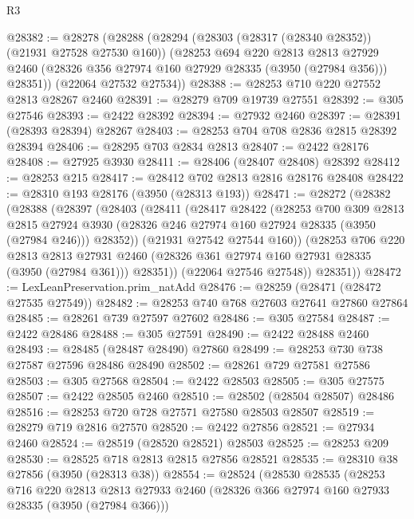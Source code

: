 \begin{lexlean}{R3}
\begin{coremodule}
@28382 := @28278
    (@28288
      (@28294
        (@28303 (@28317 (@28340 @28352)) (@21931 @27528 @27530 @160))
        (@28253
          @694
          @220
          @2813
          @2813
          @27929
          @2460
          (@28326 @356 @27974 @160 @27929 @28335 (@3950 (@27984 @356)))
          @28351))
      (@22064 @27532 @27534))
@28388 := @28253 @710 @220 @27552 @2813 @28267 @2460
@28391 := @28279 @709 @19739 @27551
@28392 := @305 @27546
@28393 := @2422 @28392
@28394 := @27932 @2460
@28397 := @28391 (@28393 @28394) @28267
@28403 := @28253 @704 @708 @2836 @2815 @28392 @28394
@28406 := @28295 @703 @2834 @2813
@28407 := @2422 @28176
@28408 := @27925 @3930
@28411 := @28406 (@28407 @28408) @28392
@28412 := @28253 @215
@28417 := @28412 @702 @2813 @2816 @28176 @28408
@28422 := @28310 @193 @28176 (@3950 (@28313 @193))
@28471 := @28272
    (@28382
      (@28388
        (@28397
          (@28403
            (@28411
              (@28417
                @28422
                (@28253
                  @700
                  @309
                  @2813
                  @2815
                  @27924
                  @3930
                  (@28326 @246 @27974 @160 @27924 @28335 (@3950 (@27984 @246)))
                  @28352))
              (@21931 @27542 @27544 @160))
            (@28253
              @706
              @220
              @2813
              @2813
              @27931
              @2460
              (@28326 @361 @27974 @160 @27931 @28335 (@3950 (@27984 @361)))
              @28351))
          (@22064 @27546 @27548))
        @28351))
@28472 := LexLeanPreservation.prim_natAdd
@28476 := @28259 (@28471 (@28472 @27535 @27549))
@28482 := @28253 @740 @768 @27603 @27641 @27860 @27864
@28485 := @28261 @739 @27597 @27602
@28486 := @305 @27584
@28487 := @2422 @28486
@28488 := @305 @27591
@28490 := @2422 @28488 @2460
@28493 := @28485 (@28487 @28490) @27860
@28499 := @28253 @730 @738 @27587 @27596 @28486 @28490
@28502 := @28261 @729 @27581 @27586
@28503 := @305 @27568
@28504 := @2422 @28503
@28505 := @305 @27575
@28507 := @2422 @28505 @2460
@28510 := @28502 (@28504 @28507) @28486
@28516 := @28253 @720 @728 @27571 @27580 @28503 @28507
@28519 := @28279 @719 @2816 @27570
@28520 := @2422 @27856
@28521 := @27934 @2460
@28524 := @28519 (@28520 @28521) @28503
@28525 := @28253 @209
@28530 := @28525 @718 @2813 @2815 @27856 @28521
@28535 := @28310 @38 @27856 (@3950 (@28313 @38))
@28554 := @28524
    (@28530
      @28535
      (@28253
        @716
        @220
        @2813
        @2813
        @27933
        @2460
        (@28326 @366 @27974 @160 @27933 @28335 (@3950 (@27984 @366)))

\end{coremodule}
\end{lexlean}
